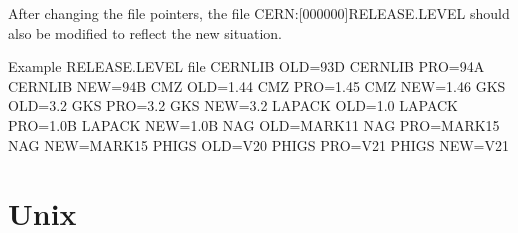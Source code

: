 After changing the file pointers, the file CERN:[000000]RELEASE.LEVEL
should also be modified to reflect the new situation.

\begin{XMPt}{Example RELEASE.LEVEL file}
CERNLIB OLD=93D
CERNLIB PRO=94A
CERNLIB NEW=94B  
CMZ     OLD=1.44
CMZ     PRO=1.45 
CMZ     NEW=1.46 
GKS     OLD=3.2  
GKS     PRO=3.2  
GKS     NEW=3.2
LAPACK  OLD=1.0
LAPACK  PRO=1.0B
LAPACK  NEW=1.0B  
NAG     OLD=MARK11
NAG     PRO=MARK15
NAG     NEW=MARK15
PHIGS   OLD=V20
PHIGS   PRO=V21
PHIGS   NEW=V21
\end{XMPt}
\section{Unix}

